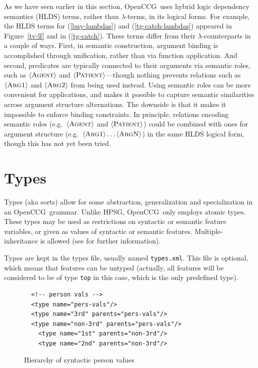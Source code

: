 \documentclass[11pt]{article}
\newcommand{\occg}{OpenCCG}
\begin{document}
As we have seen earlier in this section, \occg\ uses hybrid logic
dependency semantics (HLDS) terms, rather than $\lambda$-terms, in its
logical forms. For example, the HLDS terms for (\ref{buy-lambdas}) and
(\ref{tg-catch-lambdas}) appeared in Figure~\ref{tv-lf} and in
(\ref{tg-catch}). These terms differ from their $\lambda$-counterparts
in a couple of ways. First, in semantic construction, argument binding
is accomplished through unification, rather than via function
application. And second, predicates are typically connected to their
arguments via semantic roles, such as $\langle\textsc{Agent}\rangle$ and
$\langle\textsc{Patient}\rangle$---though nothing prevents relations such as
$\langle\textsc{Arg1}\rangle$ and $\langle\textsc{Arg2}\rangle$ from being used instead. Using semantic
roles can be more convenient for applications, and makes it possible to
capture semantic similarities across argument structure alternations.
The downside is that it makes it impossible to enforce binding
constraints. In principle, relations encoding semantic roles (e.g.\
$\langle\textsc{Agent}\rangle$ and $\langle\textsc{Patient}\rangle$) could be combined with ones for
argument structure (e.g.\ $\langle\textsc{Arg1}\rangle \ldots \langle\textsc{ArgN}\rangle$) in the same
HLDS logical form, though this has not yet been tried.


\section{Types}
\label{types}

Types (aka sorts) allow for some abstraction, generalization and
specialization in an \occg\ grammar. Unlike HPSG, \occg\ only employs
atomic types. These types may be used as restrictions on syntactic or
semantic feature variables, or given as values of syntactic or semantic
features. Multiple-inheritance is allowed (see \cite{erkanms03} for
further information).

Types are kept in the types file, usually named \texttt{types.xml}. This
file is optional, which means that features can be untyped (actually,
all features will be considered to be of type \texttt{top} in this case,
which is the only predefined type). 

\begin{figure}
\begin{verbatim}
  <!-- person vals -->
  <type name="pers-vals"/>
  <type name="3rd" parents="pers-vals"/>
  <type name="non-3rd" parents="pers-vals"/>
    <type name="1st" parents="non-3rd"/>
    <type name="2nd" parents="non-3rd"/>
\end{verbatim}
\caption{Hierarchy of syntactic person values}
\label{pers-vals}
\end{figure}
\end{document}
